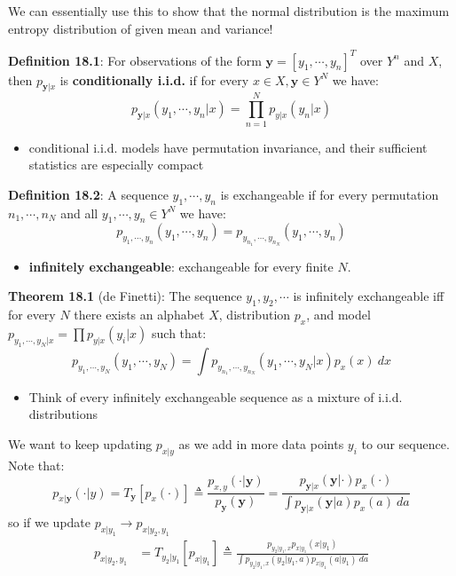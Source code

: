 \documentclass[12pt]{article} %
\begin{document}
We can essentially use this to show that the normal distribution is the maximum entropy distribution of given mean and variance!

\newpage
{}

\textbf{Definition 18.1}: For observations of the form $\mathbf{y} = [y_1, \cdots, y_n]^T$ over $Y^n$ and $X$, then $p_{\mathbf{y}|x}$ is \textbf{conditionally i.i.d.} if for every $x \in X, \mathbf{y} \in Y^N$ we have:
\begin{equation*}
    p_{\mathbf{y}|x}(y_1,\cdots,y_n|x) = 
    \prod_{n=1}^N p_{y|x}(y_n|x)
\end{equation*}
\begin{itemize}[topsep=-1pt, itemsep=-1pt]
    \item conditional i.i.d. models have permutation invariance, and their sufficient statistics are especially compact
\end{itemize}

\textbf{Definition 18.2}: A sequence $y_1,\cdots,y_n$ is exchangeable if for every permutation $n_1,\cdots,n_N$ and all $y_1,\cdots,y_n \in Y^N$ we have:
\begin{equation*}
    p_{y_1,\cdots,y_n}(y_1,\cdots,y_n) = p_{y_{n_1},\cdots, y_{n_N}}(y_1,\cdots,y_n)
\end{equation*}
\begin{itemize}[topsep=-1pt, itemsep=-1pt]
    \item \textbf{infinitely exchangeable}: exchangeable for every finite $N$.
\end{itemize}

\textbf{Theorem 18.1} (de Finetti): The sequence $y_1,y_2,\cdots$ is infinitely exchangeable iff for every $N$ there exists an alphabet $X$, distribution $p_x$, and model $p_{y_1,\cdots, y_N|x} = \prod p_{y|x}(y_i|x)$ such that:
\begin{equation*}
    p_{y_1,\cdots,y_N}(y_1,\cdots,y_N)
    =
    \int
    p_{y_{n_1},\cdots, y_{n_N}}(y_1,\cdots,y_N|x)
    p_x(x)
    \ dx
\end{equation*}
\begin{itemize}[topsep=-1pt, itemsep=-1pt]
    \item Think of every infinitely exchangeable sequence as a mixture of i.i.d. distributions
\end{itemize}

\separate

We want to keep updating $p_{x|y}$ as we add in more data points $y_i$ to our sequence. Note that:
\begin{equation*}
    p_{x|\mathbf{y}}(\cdot | y)
    = T_{\mathbf{y}}[p_x(\cdot)]
    \triangleq
    \frac{p_{x,y}(\cdot | \mathbf{y})}{p_{\mathbf{y}}(\mathbf{y})}
    =
    \frac{
    p_{\mathbf{y}|x}(\mathbf{y}|\cdot) p_x(\cdot)
    }{
    \int
    p_{\mathbf{y}|x}(\mathbf{y}|a) p_x(a)
    \ da
    }
\end{equation*}
so if we update $p_{x|y_1} \rightarrow p_{x|y_2,y_1}$
\begin{align*}
    p_{x|y_2,y_1} 
    &= T_{y_2|y_1}[p_{x|y_1}] 
    \triangleq
    \frac{
    p_{y_2|y_1,x} p_{x|y_1}(x|y_1)
    }{
    \int
    p_{y_2|y_1,x}(y_2|y_1,a)
    p_{x|y_1}(a|y_1) 
    \ da
    }
\end{align*}
\end{document}
